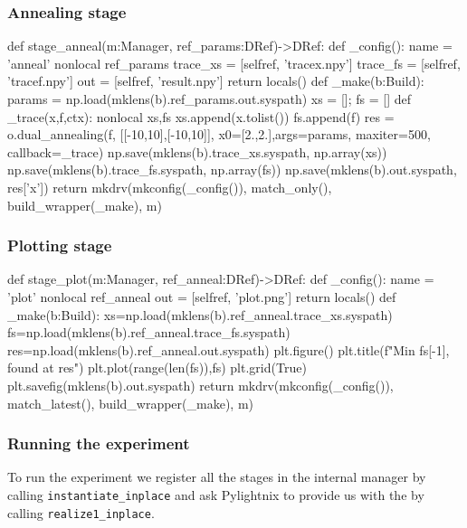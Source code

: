 \subsubsection{Annealing stage}

\begin{pythontexcode}
def stage_anneal(m:Manager, ref_params:DRef)->DRef:
  def _config():
    name = 'anneal'
    nonlocal ref_params
    trace_xs = [selfref, 'tracex.npy']
    trace_fs = [selfref, 'tracef.npy']
    out = [selfref, 'result.npy']
    return locals()
  def _make(b:Build):
    params = np.load(mklens(b).ref_params.out.syspath)
    xs = []; fs = []
    def _trace(x,f,ctx):
      nonlocal xs,fs
      xs.append(x.tolist())
      fs.append(f)
    res = o.dual_annealing(f, [[-10,10],[-10,10]],
                         x0=[2.,2.],args=params,
                         maxiter=500, callback=_trace)
    np.save(mklens(b).trace_xs.syspath, np.array(xs))
    np.save(mklens(b).trace_fs.syspath, np.array(fs))
    np.save(mklens(b).out.syspath, res['x'])
  return mkdrv(mkconfig(_config()), match_only(), build_wrapper(_make), m)
\end{pythontexcode}

\subsubsection{Plotting stage}

\begin{pythontexcode}
def stage_plot(m:Manager, ref_anneal:DRef)->DRef:
  def _config():
    name = 'plot'
    nonlocal ref_anneal
    out = [selfref, 'plot.png']
    return locals()
  def _make(b:Build):
    xs=np.load(mklens(b).ref_anneal.trace_xs.syspath)
    fs=np.load(mklens(b).ref_anneal.trace_fs.syspath)
    res=np.load(mklens(b).ref_anneal.out.syspath)
    plt.figure()
    plt.title(f"Min {fs[-1]}, found at {res}")
    plt.plot(range(len(fs)),fs)
    plt.grid(True)
    plt.savefig(mklens(b).out.syspath)
  return mkdrv(mkconfig(_config()), match_latest(), build_wrapper(_make), m)
\end{pythontexcode}

\subsubsection{Running the experiment}

To run the experiment we register all the stages in the internal manager by
calling \texttt{instantiate\_inplace} and ask Pylightnix to provide us with the
 by calling
\texttt{realize1\_inplace}.

